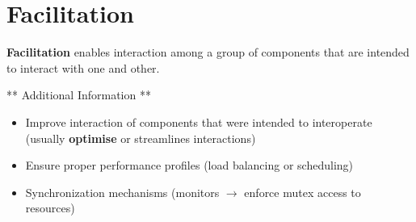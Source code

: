 \documentclass[a4paper]{report}
\begin{document}
\section{Facilitation}
\textbf{Facilitation} enables interaction among a group of components that are intended to interact with one and other.

** Additional Information ** 
\begin{itemize}
\item Improve interaction of components that were intended to interoperate (usually \textbf{optimise} or streamlines interactions)
\item Ensure proper performance profiles (load balancing or scheduling)
\item Synchronization mechanisms (monitors $\rightarrow$ enforce mutex access to resources)
\end{itemize}
\end{document}
